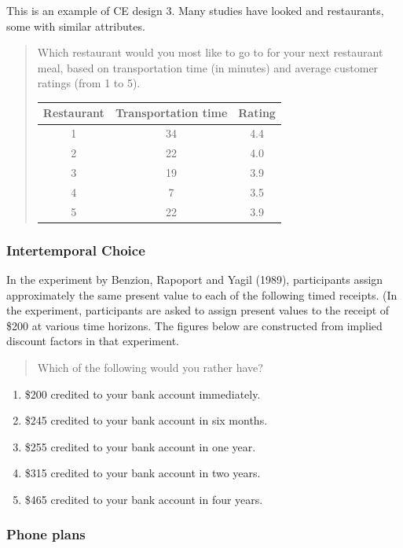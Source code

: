 \documentclass[11pt,letter]{amsart}
\begin{document}
This is an example of CE design 3. Many studies have looked and restaurants,
some with similar attributes.

\begin{quotation}
Which restaurant would you most like to go to for your next restaurant meal,
based on transportation time (in minutes) and average customer ratings (from
1 to 5).

\begin{tabular}{ccc}
\hline
Restaurant & Transportation time & Rating \\ \hline
1 & 34 & 4.4 \\ 
2 & 22 & 4.0 \\ 
3 & 19 & 3.9 \\ 
4 & 7 & 3.5 \\ 
5 & 22 & 3.9 \\ \hline
\end{tabular}
\end{quotation}

\subsubsection{Intertemporal Choice}

In the experiment by Benzion, Rapoport and Yagil (1989), participants assign approximately the same present value to each of the following timed receipts.
(In the experiment, participants are asked to assign present values to the receipt of \$200 at various time horizons. The figures below are constructed from implied discount factors in that experiment.

\begin{quotation}
	Which of the following would you rather have?
\end{quotation}

\begin{enumerate}
	\item \$200 credited to your bank account immediately.
	\item \$245 credited to your bank account in six months.
	\item \$255 credited to your bank account in one year.
	\item \$315 credited to your bank account in two years.
	\item \$465 credited to your bank account in four years.
\end{enumerate}

\subsubsection{Phone plans}
\end{document}
